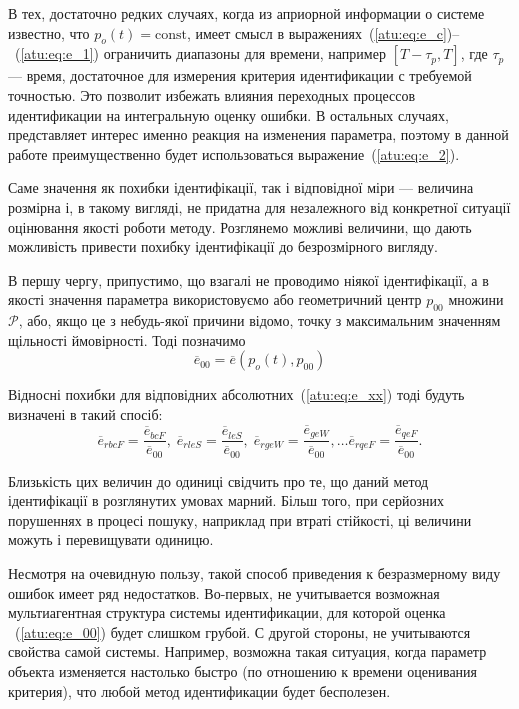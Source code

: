 В тех, достаточно редких случаях, когда из априорной
информации о системе известно, что $p_o(t) = \mathrm{const}$,
имеет смысл в выражениях~(\ref{atu:eq:e_c})--~(\ref{atu:eq:e_1})
ограничить диапазоны для времени, например $[T-\tau_p,T]$,
где $\tau_p$ --- время, достаточное для измерения
критерия идентификации с требуемой точностью.
Это позволит избежать влияния переходных процессов
идентификации на интегральную оценку ошибки.
В остальных случаях, представляет интерес именно реакция
на изменения параметра, поэтому в данной работе преимущественно будет
использоваться выражение~(\ref{atu:eq:e_2}).



Саме значення як похибки ідентифікації, так і відповідної міри ---
величина розмірна і, в такому вигляді, не придатна для незалежного від
конкретної ситуації оцінювання якості роботи методу. Розглянемо можливі
величини, що дають можливість привести похибку ідентифікації до безрозмірного
вигляду.

В першу чергу, припустимо, що взагалі не проводимо ніякої
ідентифікації, а в якості значення параметра використовуємо або геометричний
центр $p_{00}$ множини $\mathcal{P}$, або, якщо це з небудь-якої причини
відомо, точку з максимальним значенням щільності ймовірності. Тоді позначимо
%
\begin{equation}
  \overline{e}_{00}
  =
  \overline{e}(p_o(t),p_{00})
  \label{atu:eq:e_00}
\end{equation}

Відносні похибки для відповідних абсолютних~(\ref{atu:eq:e_xx})
тоді будуть визначені в такий спосіб:
%
\begin{equation}
  \overline{e}_{rbcF} = \frac{\overline{e}_{bcF}}{\overline{e}_{00}}, \;
  \overline{e}_{rleS} = \frac{\overline{e}_{leS}}{\overline{e}_{00}}, \;
  \overline{e}_{rgeW} = \frac{\overline{e}_{geW}}{\overline{e}_{00}},
  \ldots
  \overline{e}_{rqeF} = \frac{\overline{e}_{qeF}}{\overline{e}_{00}}.
  \label{atu:eq:e_rxx}
\end{equation}

Близькість цих величин до одиниці свідчить про те, що даний метод ідентифікації
в розглянутих умовах марний. Більш того, при серйозних порушеннях в процесі
пошуку, наприклад при втраті стійкості, ці величини можуть і перевищувати
одиницю.

Несмотря на очевидную пользу, такой способ приведения к безразмерному виду ошибок
имеет ряд недостатков. Во-первых,
не учитывается возможная мультиагентная структура системы идентификации,
для которой оценка ~(\ref{atu:eq:e_00}) будет слишком грубой.
С другой стороны,
не учитываются свойства
самой системы. Например, возможна такая ситуация, когда параметр
объекта изменяется настолько быстро (по отношению к времени оценивания критерия),
что любой метод идентификации будет бесполезен.

